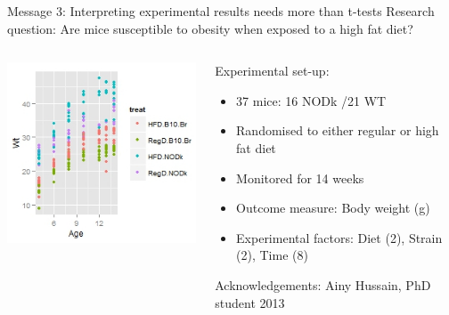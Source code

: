 \documentclass[10pt]{beamer}
\begin{document}
\begin{frame}{Message 3: Interpreting experimental results needs more than t-tests}
 \pause
 Research question: Are mice susceptible to obesity when exposed to a high fat diet?
 
  \begin{columns}
    \begin{column}{0.5\textwidth}
	\begin{center}
	\includegraphics[width=\textwidth]{Figures/message3}
	\end{center}
    \end{column}
    
    \begin{column}{0.5\textwidth}
    \begin{block}{Experimental set-up:}
      \begin{itemize}
	\item 37 mice: 16 NODk /21 WT
	\item Randomised to either regular or high fat diet
	\item Monitored for 14 weeks
	\item Outcome measure: Body weight (g)
	\item Experimental factors: Diet (2), Strain (2), Time (8)
      \end{itemize}
      \end{block}
      \tiny Acknowledgements: Ainy Hussain, PhD student 2013
    \end{column}
  \end{columns}
   
\end{frame}
\end{document}
